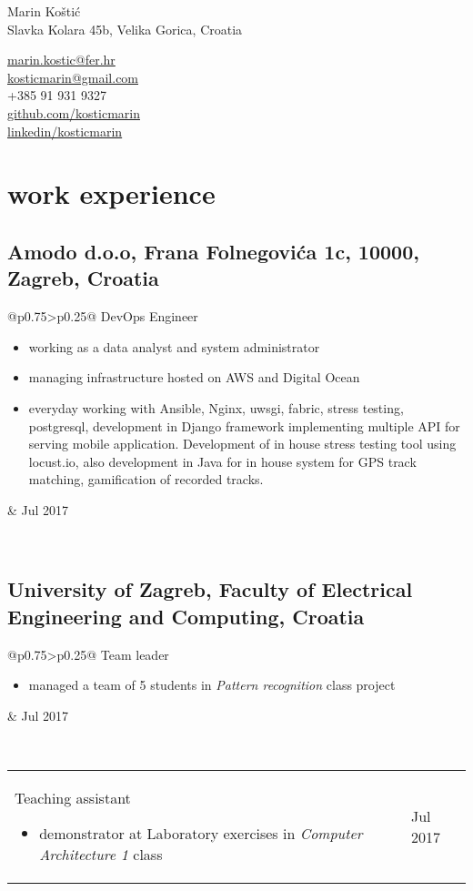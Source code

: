 \documentclass[a4paper]{article}
\makeatletter
\newlength{\tablewidth}
\newenvironment{period}[2]{%
\newcommand{\sarma}{#2}%
\setlength{\tablewidth}{\linewidth}
\addtolength{\tablewidth}{-2\tabcolsep}
\begin{tabular}{@{}p{0.75\tablewidth}>{\raggedleft\arraybackslash}p{0.25\tablewidth}@{}}%
#1 \newline
\begin{itemize}
}{%
\end{itemize} & \sarma \\%
\end{tabular}\\
}
\makeatother
\begin{document}
\fontfamily{\sfdefault}
\selectfont

\begin{minipage}{.5\textwidth}
\LARGE{Marin Koštić}\\
\normalsize{Slavka Kolara 45b, Velika Gorica, Croatia}
\end{minipage}%
\begin{minipage}{.5\textwidth}
\raggedleft
\href{mailto:marin.kostic@fer.hr}{marin.kostic@fer.hr} \\
\href{mailto:kosticmarin@gmail.com}{kosticmarin@gmail.com}\\
+385 91 931 9327 \\
\href{https://github.com/kosticmarin}{github.com/kosticmarin}\\
\href{https://www.linkedin.com/in/marin-koštić-495949155}{linkedin/kosticmarin}
\end{minipage}

\vspace{1em}

\section{work experience}
\subsection{Amodo d.o.o, Frana Folnegovića 1c, 10000, Zagreb, Croatia}
\begin{period}{DevOps Engineer}{Jul 2017}
	\item working as a data analyst and system administrator
	\item managing infrastructure hosted on AWS and Digital Ocean
	\item everyday working with Ansible, Nginx, uwsgi, fabric, stress testing, postgresql, development in Django framework implementing multiple API for serving
	mobile application. Development of in house stress testing tool using locust.io, also development in Java for in house system for GPS track matching, gamification
	of recorded tracks.
\end{period}
\subsection{University of Zagreb, Faculty of Electrical Engineering and Computing, Croatia}
\begin{period}{Team leader}{Sep 2016 -- Jan 2017}
    \item managed a team of 5 students in \textit{Pattern recognition} class project
\end{period}
\begin{period}{Teaching assistant}{Jan 2015 -- May 2015}
	\item demonstrator at Laboratory exercises in \textit{Computer Architecture 1} class
\end{period}
\end{document}
